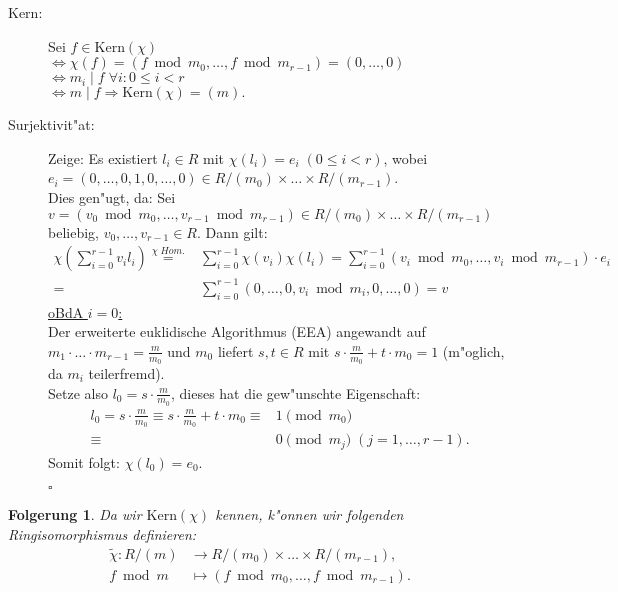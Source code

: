 \documentclass{article}
\newtheorem{Fol}{Folgerung}
\newcommand{\Kern}[1]{\ensuremath{\mathrm{Kern}(#1)}}
\begin{document}
\begin{description}
	\item[\textmd{Kern:}] Sei $f \in \Kern{\chi}$ \\
		$\Longleftrightarrow \chi(f) = (f \bmod m_0,\dots,f \bmod m_{r-1}) = (0,\dots,0)$ \\
		$\Longleftrightarrow m_i \mid f \; \forall i: 0 \le i < r$ \\
		$\Longleftrightarrow m \mid f \Rightarrow \Kern{\chi}=(m).$
	\item[\textmd{Surjektivit"at:}]
	Zeige: Es existiert $l_i \in R$ mit $\chi(l_i)=e_i \; (0 \le i < r)$, wobei $e_i=(0,\dots,0, 1, 0,\dots, 0) \in R/(m_0) \times \dots \times R/(m_{r-1})$. \\
	Dies gen"ugt, da: Sei $v=(v_0 \bmod m_0,\dots,v_{r-1} \bmod m_{r-1}) \in R/(m_0) \times \dots \times R/(m_{r-1})$ beliebig, $v_0, \dots, v_{r-1} \in R$. Dann gilt:
	\begin{equation*}
		\begin{split}
			\chi(\sum_{i=0}^{r-1} v_i l_i) \stackrel{\chi \; Hom.}{=}& \sum_{i=0}^{r-1} \chi(v_i) \chi(l_i) = \sum_{i=0}^{r-1} (v_i \bmod m_0, \dots, v_i \bmod m_{r-1}) \cdot e_i \\
			=& \sum_{i=0}^{r-1} (0, \dots, 0, v_i \bmod m_i, 0, \dots, 0) = v
		\end{split}
	\end{equation*}
	\underline{oBdA $i=0$:}\\
	Der erweiterte euklidische Algorithmus (EEA) angewandt auf $m_1 \cdot \dotso \cdot m_{r-1} = \frac{m}{m_0}$
	und $m_0$ liefert $s, t \in R$ mit $s \cdot \frac{m}{m_0} + t \cdot m_0 = 1$ (m"oglich, da $m_i$ teilerfremd). \\
	Setze also $l_0 = s \cdot \frac{m}{m_0}$, dieses hat die gew"unschte Eigenschaft:
	\begin{equation*}
		\begin{split}
			l_0 = s \cdot \frac{m}{m_0} \equiv s \cdot \frac{m}{m_0} + t \cdot m_0 \equiv& 1 \pmod {m_0}\\
			\equiv& 0 \pmod {m_j} \; (j=1,\dots,r-1).
		\end{split}
	\end{equation*}
	Somit folgt: $\chi(l_0) = e_0$.
	\begin{flushright}
		$\square$
	\end{flushright}
\end{description}

\begin{Fol}
Da wir $\Kern{\chi}$ kennen, k"onnen wir folgenden Ringisomorphismus definieren:
\begin{equation*}
	\begin{split}
		\tilde{\chi} : R/(m)& \longrightarrow R/(m_0) \times \dots \times R/(m_{r-1}), \\
		f \bmod m& \longmapsto (f \bmod m_0, \dots , f \bmod m_{r-1}).
	\end{split}
\end{equation*}
\end{Fol}
\end{document}
